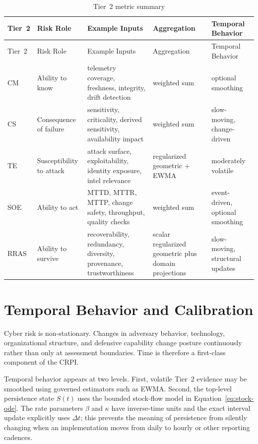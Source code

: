 \documentclass[11pt]{article}
\begin{document}
\begingroup
\small
\setlength{\tabcolsep}{4pt}
\renewcommand{\arraystretch}{1.15}
\begin{longtable}{P{0.09\textwidth} P{0.17\textwidth} P{0.27\textwidth} P{0.16\textwidth} P{0.19\textwidth}}
  \caption{Tier~2 metric summary}
  \label{tab:tier2summary}\\
  \toprule
  Tier~2 & Risk Role & Example Inputs & Aggregation & Temporal Behavior \\
  \midrule
  \endfirsthead
  \toprule
  Tier~2 & Risk Role & Example Inputs & Aggregation & Temporal Behavior \\
  \midrule
  \endhead
  CM & Ability to know & telemetry coverage, freshness, integrity, drift detection & weighted sum & optional smoothing \\
  CS & Consequence of failure & sensitivity, criticality, derived sensitivity, availability impact & weighted sum & slow-moving, change-driven \\
  TE & Susceptibility to attack & attack surface, exploitability, identity exposure, intel relevance & regularized geometric + EWMA & moderately volatile \\
  SOE & Ability to act & MTTD, MTTR, MTTP, change safety, throughput, quality checks & weighted sum & event-driven, optional smoothing \\
  RRAS & Ability to survive & recoverability, redundancy, diversity, provenance, trustworthiness & scalar regularized geometric plus domain projections & slow-moving, structural updates \\
  \bottomrule
\end{longtable}
\endgroup

\section{Temporal Behavior and Calibration}
\label{sec:temporal}
Cyber risk is non-stationary. Changes in adversary behavior, technology, organizational
structure, and defensive capability change posture continuously rather than only at
assessment boundaries. Time is therefore a first-class component of the CRPI.

Temporal behavior appears at two levels. First, volatile Tier~2 evidence may be smoothed
using governed estimators such as EWMA. Second, the top-level persistence state $S(t)$
uses the bounded stock-flow model in Equation~\ref{eq:stock-ode}. The rate parameters
$\beta$ and $\kappa$ have inverse-time units and the exact interval update explicitly
uses $\Delta t$; this prevents the meaning of persistence from silently changing when an
implementation moves from daily to hourly or other reporting cadences.
\end{document}
